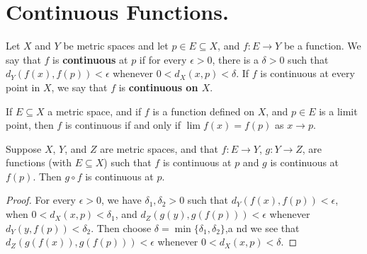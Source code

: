 
\section{Continuous Functions.}

\begin{definition}
    Let $X$ and  $Y$ be metric spaces and let  $p \in E \subseteq X$, and  $f:E \rightarrow Y$ be a 
    function. We say that $f$ is \textbf{continuous} at $p$ if for every  $\epsilon>0$, there is a 
    $\delta>0$ such that  $d_Y(f(x),f(p))<\epsilon$ whenever $0<d_X(x,p)<\delta$. If  $f$ is continuous 
    at every point in  $X$, we say that  $f$ is \textbf{continuous on $X$}.
\end{definition}

\begin{theorem}\label{5.2.1}
    If $E \subseteq X$ a metric space, and if  $f$ is a function defined on $X$,  and  $p \in E$ 
    is a limit point, then  $f$ is continuous if and only if  $\lim{f(x)}=f(p)$ as  $x \rightarrow p$.
\end{theorem}

\begin{theorem}\label{5.2.2}
    Suppose $X$, $Y$, and  $Z$ are metric spaces, and that  $f:E \rightarrow Y$,  $g:Y \rightarrow Z$, are 
    functions  (with $E \subseteq X$) such that $f$ is continuous at  $p$ and  $g$ is 
    continuous at  $f(p)$. Then  $g \circ f$ is continuous at  $p$.
\end{theorem}
\begin{proof}
    For every $\epsilon>0$, we have  $\delta_1,\delta_2>0$ such that $d_Y(f(x),f(p))<\epsilon$, when 
    $0<d_X(x,p)<\delta_1$, and  $d_Z(g(y),g(f(p)))<\epsilon$ whenever  $d_Y(y,f(p))<\delta_2$. Then 
    choose  $\delta=\min\{\delta_1,\delta_2\}$,a nd we see that  $d_Z(g(f(x)),g(f(p)))<\epsilon$ whenever 
    $0<d_X(x,p)<\delta$.
\end{proof}

